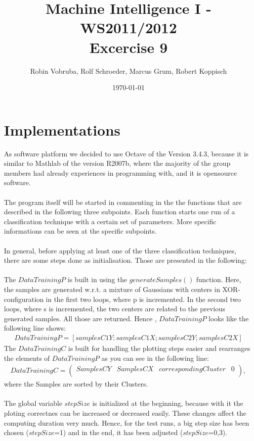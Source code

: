 \documentclass[a4paper,headings=small]{scrartcl}
\title{Machine Intelligence I - WS2011/2012\\Excercise 9}
\author{Robin Vobruba, Rolf Schroeder, Marcus Grum, Robert Koppisch}
\date{\today}
\begin{document}
\maketitle

\section{Implementations}
As software platform we decided to use Octave of the Version 3.4.3, because it is similar to Mathlab of the version R2007b, where the majority of the group members had already experiences in programming with, and it is opensource software.\\
\\
The program itself will be started in commenting in the the functions that are described in the following three subpoints. Each function starts one run of a classification technique with a certain set of parameters. More specific informations can be seen at the specific subpoints.\\
\\
In general, before applying at least one of the three classification techniques, there are some steps done as initialisation. Those are presented in the following:\\
\\
The $DataTrainingP$ is built in using the $generateSamples()$ function. Here, the samples are generated w.r.t. a mixture of Gaussians with centers in XOR-configuration in the first two loops, where p is incremented. In the second two loops, where s is incremented, the two centers are related to the previous generated samples. All those are returned. Hence , $DataTrainingP$ looks like the following line shows:
\begin{align}
DataTrainingP = [samplesC1Y; samplesC1X; samplesC2Y; samplesC2X]
\end{align}
The $DataTrainingC$ is built for handling the plotting steps easier and rearranges the elements of $DataTrainingP$ as you can see in the following line:
\begin{align}
DataTrainingC = 
\left(
\begin{array}{cccc}
	SamplesCY & SamplesCX & corresponding Cluster	& 0\\
\end{array}
\right),
\end{align} where the Samples are sorted by their Clusters.\\
\\
The global variable $stepSize$ is initialized at the beginning, because with it the ploting correctnes can be increased or decreased easily. These changes affect the computing duration very much. Hence, for the test runs, a big step size has been chosen ($stepSize$=1) and in the end, it has been adjusted ($stepSize$=0,3).\\
\end{document}
